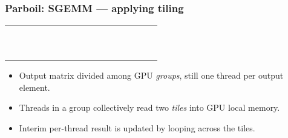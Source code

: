 \documentclass[rgb,dvipsnames]{beamer}
\begin{document}
\begin{frame}
  \frametitle{Parboil: SGEMM --- applying tiling}

  \begin{minipage}{0.49\linewidth}
  \begin{tabular}{|c|c|c|c|c|c|c|c|c|c|c|c|c|c|c|c|c|c|}
    \hline
    &&&&&&&&&&&\\\hline
    &&&&&&&&&&&\\\hline
    &&&&&&&&&&&\\\hline
    &&&&&&&&&&&\\\hline
    &&&&&&&&&&&\\\hline
    &&&&&&&&&&&\\\hline
    &&&\SGg{}&\SGg{}&\SGg{}&&&&&&\\\hline
    &&&\SGg{}&\SGg{}&\SGg{}&&&&&&\\\hline
    &&&\SGg{}&\SGg{}&\SGg{}&&&&&&\\\hline
    &&&&&&&&&&&\\\hline
    &&&&&&&&&&&\\\hline
    &&&&&&&&&&&\\\hline
  \end{tabular}
\end{minipage}
\begin{minipage}{0.49\linewidth}
  \begin{itemize}
  \item Output matrix divided among GPU \textit{groups}, still one
    thread per output element.
  \item Threads in a group collectively read two \textit{tiles} into
    GPU local memory.
  \item Interim per-thread result is updated by looping across the
    tiles.
  \end{itemize}
\end{minipage}

\bigskip
\bigskip
\end{frame}
\end{document}
